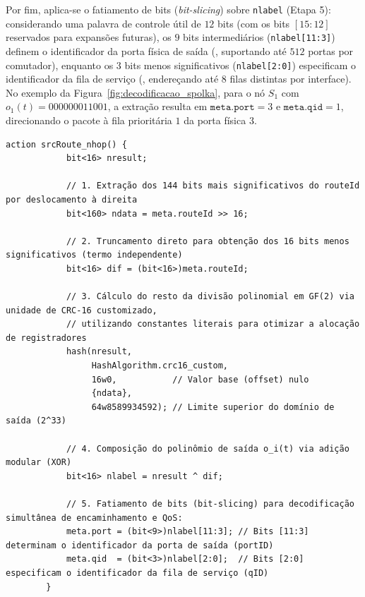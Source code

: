 Por fim, aplica-se o fatiamento de bits (\textit{bit-slicing}) sobre \texttt{nlabel} (Etapa 5): considerando uma palavra de controle útil de $12$ bits (com os bits $[15:12]$ reservados para expansões futuras), os $9$ bits intermediários (\texttt{nlabel[11:3]}) definem o identificador da porta física de saída (\portID, suportando até $512$ portas por comutador), enquanto os $3$ bits menos significativos (\texttt{nlabel[2:0]}) especificam o identificador da fila de serviço (\qID, endereçando até $8$ filas distintas por interface). No exemplo da Figura~\ref{fig:decodificacao_spolka}, para o nó $S_1$ com $o_1(t) = 000000011001$, a extração resulta em $\texttt{meta.port} = 3$ e $\texttt{meta.qid} = 1$, direcionando o pacote à fila prioritária $1$ da porta física $3$.

\begin{quadro}[htb]
    \centering
    \caption{Função de cálculo do rótulo SPolKA em linguagem P4}
    \label{quad:codigo_controle}
    \begin{lstlisting}[language=P4]
        action srcRoute_nhop() {
            bit<16> nresult;
    
            // 1. Extração dos 144 bits mais significativos do routeId por deslocamento à direita
            bit<160> ndata = meta.routeId >> 16;
            
            // 2. Truncamento direto para obtenção dos 16 bits menos significativos (termo independente)
            bit<16> dif = (bit<16>)meta.routeId;
    
            // 3. Cálculo do resto da divisão polinomial em GF(2) via unidade de CRC-16 customizado,
            // utilizando constantes literais para otimizar a alocação de registradores
            hash(nresult,
                 HashAlgorithm.crc16_custom,
                 16w0,           // Valor base (offset) nulo
                 {ndata}, 
                 64w8589934592); // Limite superior do domínio de saída (2^33)
    
            // 4. Composição do polinômio de saída o_i(t) via adição modular (XOR)
            bit<16> nlabel = nresult ^ dif;
    
            // 5. Fatiamento de bits (bit-slicing) para decodificação simultânea de encaminhamento e QoS:
            meta.port = (bit<9>)nlabel[11:3]; // Bits [11:3] determinam o identificador da porta de saída (portID)
            meta.qid  = (bit<3>)nlabel[2:0];  // Bits [2:0] especificam o identificador da fila de serviço (qID)
        }
    \end{lstlisting}
\end{quadro}

